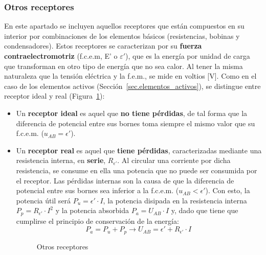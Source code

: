 \documentclass[11pt]{book} %
\begin{document}
	\subsubsection{Otros receptores}
	En este apartado se incluyen aquellos receptores que están compuestos en su interior por combinaciones de los elementos básicos (resistencias, bobinas y condensadores). Estos receptores se caracterizan por su \textbf{fuerza contraelectromotriz} (f.c.e.m, E' o $\varepsilon'$), que es la energía por unidad de carga que transforman en otro tipo de energía que no sea calor. Al tener la misma naturaleza que la tensión eléctrica y la f.e.m., se mide en voltios [V]. Como en el caso de los elementos activos (Sección~\ref{sec.elementos_activos}), se distingue entre receptor ideal y real (Figura~\ref{fig.receptores}):
	\begin{itemize}
		\item Un \textbf{receptor ideal} es aquel que \textbf{no tiene pérdidas}, de tal forma que la diferencia de potencial entre sus bornes toma siempre el mismo valor que su f.c.e.m. ($u_{AB}=\epsilon'$).
		\item Un \textbf{receptor real} es aquel que \textbf{tiene pérdidas}, caracterizadas mediante una resistencia interna, en \textbf{serie}, $R_{\epsilon'}$. Al circular una corriente por dicha resistencia, se consume en ella una potencia que no puede ser consumida por el receptor. Las pérdidas internas son la causa de que la diferencia de potencial entre sus bornes sea inferior a la f.c.e.m. ($u_{AB}<\epsilon'$). Con esto, la potencia útil será $P_u=\epsilon'\cdot I$, la potencia disipada en la resistencia interna $P_p=R_{\epsilon'}\cdot I^2$ y la potencia absorbida $P_a=U_{AB}\cdot I$ y, dado que tiene que cumplirse el principio de conservación de la energía:
		\begin{equation}
			P_a=P_u+P_p\rightarrow \boxed{U_{AB}=\epsilon'+ R_{\epsilon'}\cdot I}\,
		\end{equation}
		\begin{figure}[htbp]
			\centering
			\hfil
			\caption{Otros receptores}
			\label{fig.receptores}
		\end{figure}
	\end{itemize}
	
\end{document}
